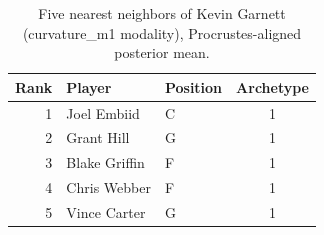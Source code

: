 \begin{table}[htbp]
  \centering\small
  \begin{tabular}{rllc}
    \toprule
    Rank & Player & Position & Archetype \\
    \midrule
    1 & Joel Embiid & C & 1 \\
    2 & Grant Hill & G & 1 \\
    3 & Blake Griffin & F & 1 \\
    4 & Chris Webber & F & 1 \\
    5 & Vince Carter & G & 1 \\
    \bottomrule
  \end{tabular}
  \caption{Five nearest neighbors of Kevin Garnett (curvature_m1 modality), Procrustes-aligned posterior mean.}
  \label{tab:Kevin_Garnett_neighbors_curvature_m1}
\end{table}

